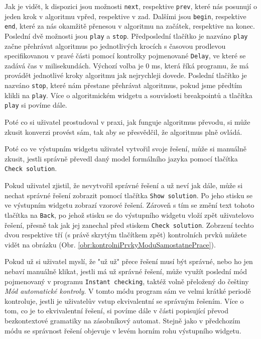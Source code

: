 Jak je vidět, k dispozici jsou možnosti \texttt{next}, respektive \texttt{prev}, které nás posunují o jeden krok v algoritmu vpřed, respektive v zad. Dalšími jsou \texttt{begin}, respektive \texttt{end}, které za nás okamžitě přenesou v algoritmu na začátek, respektive na konec. Poslední dvě možnosti jsou \texttt{play} a \texttt{stop}. Předposlední tlačítko je nazváno \texttt{play} začne přehrávat algoritmus po jednotlivých krocích s časovou prodlevou specifikovanou v pravé části pomocí kontrolky pojmenované \texttt{Delay}, ve které se zadává čas v milisekundách. Výchozí volba je 0 ms, která říká programu, že má provádět jednotlivé kroky algoritmu jak nejrychleji dovede. Poslední tlačítko je nazváno \texttt{stop}, které nám přestane přehrávat algoritmus, pokud jsme předtím klikli na \texttt{play}. Více o algoritmickém widgetu a souvislosti breakpointů a tlačítka \texttt{play} si povíme dále.


Poté co si uživatel prostudoval v praxi, jak funguje algoritmus převodu, si může zkusit konverzi provést sám, tak aby se přesvědčil, že algoritmus plně ovládá. 

Poté co ve výstupním widgetu uživatel vytvořil svoje řešení, může si manuálně zkusit, jestli správně převedl daný model formálního jazyka pomocí tlačítka \texttt{Check solution}. 

Pokud uživatel zjistil, že nevytvořil správné řešení a už neví jak dále, může si nechat správné řešení zobrazit pomocí tlačítka \texttt{Show solution}. Po jeho stisku se ve výstupním widgetu zobrazí vzorové řešení. Zároveň s tím se změní text tohoto tlačítka na \texttt{Back}, po jehož stisku se do výstupního widgetu vloží zpět uživatelovo řešení, přesně tak jak jej zanechal před stiskem \texttt{Check solution}. Zobrzení techto dvou respektive tří (s právě skrytým tlačítkem zpět) kontrolních prvků můžete vidět na obrázku (Obr. \ref{obr:kontrolniPrvkyModuSamostatnePrace}).



Pokud už si uživatel myslí, že "už už" přece řešení musí být správné, nebo ho jen nebaví manuálně klikat, jestli má už správné řešení, může využít poslední mód pojmenovaný v programu \texttt{Instant checking}, taktéž volně přeložený do češtiny \textit{Mód automatické kontroly}. V tomto módu program sám ve velmi krátké periodě kontroluje, jestli je uživatelův vstup ekvivalentní se správným řešením. Více o tom, co je to ekvivalentní řešení, si povíme dále v části popisující převod bezkontextové gramatiky na zásobníkový automat. Stejně jako v předchozím módu se správnost řešení objevuje v levém horním rohu výstupního widgetu. 

